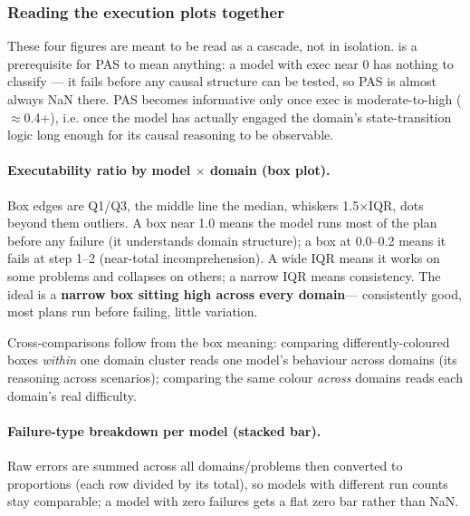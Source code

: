 \subsubsection{Reading the execution plots together}

These four figures are meant to be read as a cascade, not in isolation. is a prerequisite for PAS to mean anything: a model with exec near 0 has nothing to classify --- it fails before any causal structure can be tested, so PAS is almost always NaN there. PAS becomes informative only once exec is moderate-to-high (\(\approx\)0.4+), i.e. once the model has actually engaged the domain's state-transition logic long enough for its causal reasoning to be observable.

\paragraph{Executability ratio by model \(\times\) domain (box plot).}

Box edges are Q1/Q3, the middle line the median, whiskers 1.5\(\times\)IQR, dots beyond them outliers. A box near 1.0 means the model runs most of the plan before any failure (it understands domain structure); a box at 0.0--0.2 means it fails at step 1--2 (near-total incomprehension). A wide IQR means it works on some problems and collapses on others; a narrow IQR means consistency. The ideal is a \textbf{narrow box sitting high across every domain}--- consistently good, most plans run before failing, little variation.

Cross-comparisons follow from the box meaning: comparing differently-coloured boxes \emph{within} one domain cluster reads one model's behaviour across domains (its reasoning across scenarios); comparing the same colour \emph{across} domains reads each domain's real difficulty.

\paragraph{Failure-type breakdown per model (stacked bar).}

Raw errors are summed across all domains/problems then converted to proportions (each row divided by its total), so models with different run counts stay comparable; a model with zero failures gets a flat zero bar rather than NaN.

